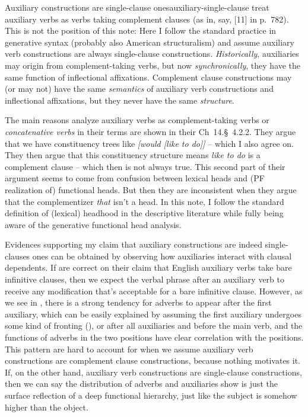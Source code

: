 \documentclass[UTF8, a4paper, oneside, scheme=plain, 12pt]{ctexbook}
\newcommand*{\citesec}[1]{\S~{#1}}
\newcommand*{\citechap}[1]{Ch~{#1}}
\newcommand*{\citepage}[1]{p.~{#1}}
\newcommand*{\citechapsec}[2]{\citechap{#1}.\citesec{#2}}
\newcommand*{\term}[1]{\emph{#1}}
\newcommand{\form}[1]{\emph{#1}}
\begin{document}
\begin{infobox}{Auxiliary constructions are single-clause ones}{auxiliary-single-clause}
    \citet{cgel} treat auxiliary verbs as verbs taking complement clauses 
    (as in, say, [11] in \citepage{782}).
    This is not the position of this note:
    Here I follow the standard practice in generative syntax (probably also American structuralism) 
    and assume auxiliary verb constructions are always single-clause constructions.
    \emph{Historically}, auxiliaries may origin from complement-taking verbs,
    but now \emph{synchronically}, they have the same function of inflectional affixations.
    Complement clause constructions may (or may not) have the same \emph{semantics} of 
    auxiliary verb constructions and inflectional affixations,
    but they never have the same \emph{structure}.

    The main reasons \citet{cgel} analyze auxiliary verbs as complement-taking verbs or
    \term{concatenative verbs} in their terms 
    are shown in their \citechapsec{14}{4.2.2}.
    They argue that we have constituency trees like
    \form{[would [like to do]]} -- which I also agree on.
    They then argue that this constituency structure means 
    \form{like to do} is a complement clause -- which then is not always true.
    This second part of their argument 
    seems to come from confusion between lexical heads and (PF realization of) functional heads.
    But then they are inconsistent when they argue that 
    the complementizer \form{that} isn't a head.
    In this note, I follow the standard definition of (lexical) headhood in the descriptive literature
    while fully being aware of the generative functional head analysis.

    Evidences supporting my claim that auxiliary constructions are indeed single-clauses ones 
    can be obtained by observing how auxiliaries interact with clausal dependents.
    If \citet{cgel} are correct on their claim that English auxiliary verbs take bare infinitive clauses,
    then we expect the verbal phrase after an auxiliary verb to receive any modification 
    that's acceptable for a bare infinitive clause.
    However, as we see in ,
    there is a strong tendency for adverbs to appear after the first auxiliary,
    which can be easily explained by assuming the first auxiliary 
    undergoes some kind of fronting (),
    or after all auxiliaries and before the main verb,
    and the functions of adverbs in the two positions 
    have clear correlation with the positions.
    This pattern are hard to account for 
    when we assume auxiliary verb constructions are complement clause constructions,
    because nothing motivates it.
    If, on the other hand, 
    auxiliary verb constructions are single-clause constructions,
    then we can say the distribution of adverbs and auxiliaries
    show is just the surface reflection of a deep functional hierarchy,
    just like the subject is somehow higher than the object.
\end{infobox}
\end{document}
